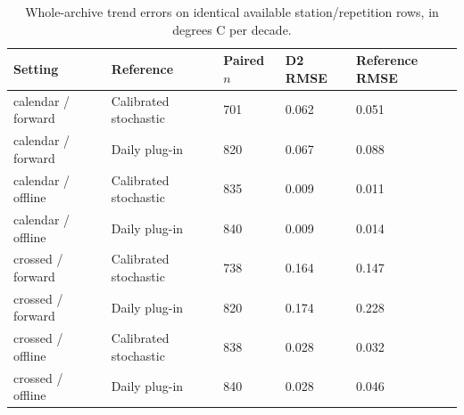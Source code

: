 \begin{table}[p]\centering\small
\caption{Whole-archive trend errors on identical available station/repetition rows, in degrees C per decade.}\label{tab:whole-archive-paired}
\begin{tabular}{lllll}
\toprule
Setting & Reference & Paired $n$ & D2 RMSE & Reference RMSE\\\midrule
calendar / forward & Calibrated stochastic & 701 & 0.062 & 0.051\\
calendar / forward & Daily plug-in & 820 & 0.067 & 0.088\\
calendar / offline & Calibrated stochastic & 835 & 0.009 & 0.011\\
calendar / offline & Daily plug-in & 840 & 0.009 & 0.014\\
crossed / forward & Calibrated stochastic & 738 & 0.164 & 0.147\\
crossed / forward & Daily plug-in & 820 & 0.174 & 0.228\\
crossed / offline & Calibrated stochastic & 838 & 0.028 & 0.032\\
crossed / offline & Daily plug-in & 840 & 0.028 & 0.046\\
\bottomrule\end{tabular}
\end{table}
